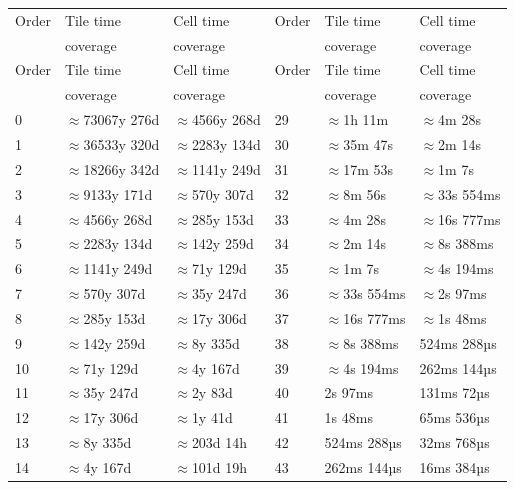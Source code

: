 \documentclass[11pt,a4paper]{ivoa}
\begin{document}
\begin{longtable}{|l|l|l||l|l|l|}
\hline
Order & Tile time & Cell time &
Order & Tile time & Cell time \\
       & coverage  & coverage  &
       & coverage  & coverage  \\ \hline
\endfirsthead

\hline
Order & Tile time & Cell time &
Order & Tile time & Cell time \\
       & coverage  & coverage  &
       & coverage  & coverage  \\ \hline
\endhead

0  & $\approx$73067y 276d & $\approx$4566y 268d &
29 & $\approx$1h 11m & $\approx$4m 28s \\ \hline
1  & $\approx$36533y 320d & $\approx$2283y 134d &
30 & $\approx$35m 47s & $\approx$2m 14s \\ \hline
2  & $\approx$18266y 342d & $\approx$1141y 249d &
31 & $\approx$17m 53s & $\approx$1m 7s \\ \hline
3  & $\approx$9133y 171d & $\approx$570y 307d &
32 & $\approx$8m 56s & $\approx$33s 554ms \\ \hline
4  & $\approx$4566y 268d & $\approx$285y 153d &
33 & $\approx$4m 28s & $\approx$16s 777ms \\ \hline
5  & $\approx$2283y 134d & $\approx$142y 259d &
34 & $\approx$2m 14s & $\approx$8s 388ms \\ \hline
6  & $\approx$1141y 249d & $\approx$71y 129d &
35 & $\approx$1m 7s & $\approx$4s 194ms \\ \hline
7  & $\approx$570y 307d & $\approx$35y 247d &
36 & $\approx$33s 554ms & $\approx$2s 97ms \\ \hline
8  & $\approx$285y 153d & $\approx$17y 306d &
37 & $\approx$16s 777ms & $\approx$1s 48ms \\ \hline
9  & $\approx$142y 259d & $\approx$8y 335d &
38 & $\approx$8s 388ms & 524ms 288µs \\ \hline
10 & $\approx$71y 129d & $\approx$4y 167d &
39 & $\approx$4s 194ms & 262ms 144µs \\ \hline
11 & $\approx$35y 247d & $\approx$2y 83d &
40 & 2s 97ms & 131ms 72µs \\ \hline
12 & $\approx$17y 306d & $\approx$1y 41d &
41 & 1s 48ms & 65ms 536µs \\ \hline
13 & $\approx$8y 335d & $\approx$203d 14h &
42 & 524ms 288µs & 32ms 768µs \\ \hline
14 & $\approx$4y 167d & $\approx$101d 19h &
43 & 262ms 144µs & 16ms 384µs \\ \hline

\end{longtable}
\end{document}
